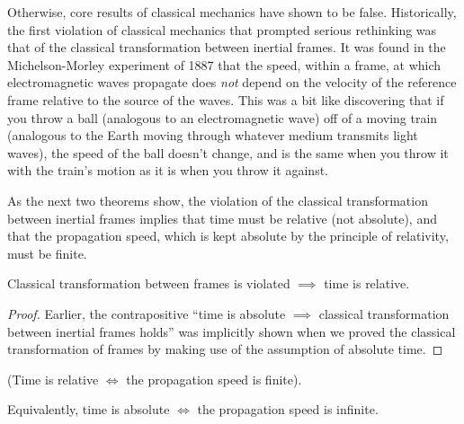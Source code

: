 \documentclass{article}
\begin{document}
Otherwise, core results of classical mechanics have shown to be false. Historically, the first violation of classical mechanics that prompted serious rethinking was that of the classical transformation between inertial frames. It was found in the Michelson-Morley experiment of 1887 that the speed, within a frame, at which electromagnetic waves propagate does \textit{not} depend on the velocity of the reference frame relative to the source of the waves. This was a bit like discovering that if you throw a ball (analogous to an electromagnetic wave) off of a moving train (analogous to the Earth moving through whatever medium transmits light waves), the speed of the ball doesn't change, and is the same when you throw it with the train's motion as it is when you throw it against.

As the next two theorems show, the violation of the classical transformation between inertial frames implies that time must be relative (not absolute), and that the propagation speed, which is kept absolute by the principle of relativity, must be finite.

\begin{theorem}
	Classical transformation between frames is violated $\implies$ time is relative.
\end{theorem}

\begin{proof}
	Earlier, the contrapositive ``time is absolute $\implies$ classical transformation between inertial frames holds'' was implicitly shown when we proved the classical transformation of frames by making use of the assumption of absolute time.
\end{proof}

\begin{theorem}
	(Time is relative $\iff$ the propagation speed is finite).
	
	Equivalently, time is absolute $\iff$ the propagation speed is infinite.
\end{theorem}
\end{document}
